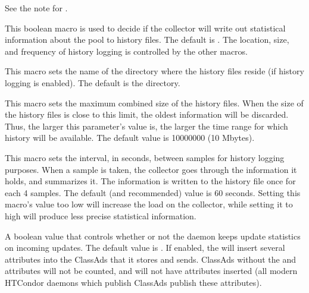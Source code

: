 \begin{description}
  \Note See the note for .

\label{param:KeepPoolHistory}
\item[\Macro{KEEP\_POOL\_HISTORY}]
  This boolean macro is used to decide if the collector will write
  out statistical information about the pool to history files.
  The default is .
  The location, size, and frequency of history logging is controlled
  by the other macros.

\label{param:PoolHistoryDir}
\item[\Macro{POOL\_HISTORY\_DIR}]
  This macro sets the name of the directory where the history
  files reside (if history logging is enabled).
  The default is the  directory.

\label{param:PoolHistoryMaxStorage} 
\item[\Macro{POOL\_HISTORY\_MAX\_STORAGE}]
  This macro sets the maximum combined size of the history files.
  When the size of the history files is close to this limit, the oldest
  information will be discarded.
  Thus, the larger this parameter's value is, the larger the time
  range for which history will be available.  The default value is
  10000000 (10 Mbytes).

\label{param:PoolHistorySamplingInterval}
\item[\Macro{POOL\_HISTORY\_SAMPLING\_INTERVAL}]
  This macro sets the interval, in seconds, between samples for
  history logging purposes. 
  When a sample is taken, the collector goes through the information
  it holds, and summarizes it.
  The information is written to the history file once for each 4
  samples.
  The default (and recommended) value is 60 seconds. Setting this
  macro's value too low will increase the load on the collector,
  while setting it to high will produce less precise statistical
  information.

\label{param:CollectorDaemonStats}
\item[\Macro{COLLECTOR\_DAEMON\_STATS}]
  A boolean value that controls whether or not the  daemon
  keeps update statistics on incoming updates.  
  The default value is .
  If enabled, the  will insert several attributes
  into the ClassAds that it stores and sends.  ClassAds without the
   and  attributes will not
  be counted, and will not have attributes inserted (all modern HTCondor
  daemons which publish ClassAds publish these attributes).


\end{description}
